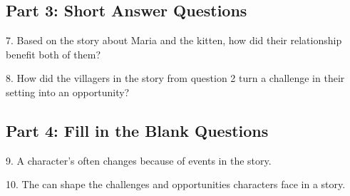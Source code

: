 \documentclass[12pt]{article}
\begin{document}
\vspace{1cm}
\newpage
\subsection*{Part 3: Short Answer Questions}

7. Based on the story about Maria and the kitten, how did their relationship benefit both of them?\\
\vspace{4cm}

8. How did the villagers in the story from question 2 turn a challenge in their setting into an opportunity?\\
\vspace{4cm}

\subsection*{Part 4: Fill in the Blank Questions}
\vspace{1cm}

9. A character’s \underline{\hspace{4cm}} often changes because of events in the story.

\vspace{3cm}

10. The \underline{\hspace{4cm}} can shape the challenges and opportunities characters face in a story.






\end{document}
